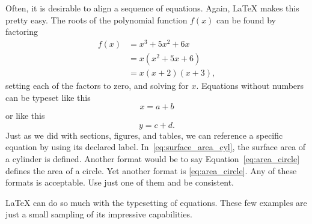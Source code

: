 Often, it is desirable to align a sequence of equations. Again, \LaTeX{} makes this pretty easy. The roots of the polynomial function $f(x)$ can be found by factoring
\begin{align}
	f(x) &= x^3 + 5x^2 + 6x \\
		 & = x (x^2 + 5x + 6) \\
		 & = x (x + 2)(x +3) ,
\end{align}
setting each of the factors to zero, and solving for $x$. Equations without numbers can be typeset like this
\[
	x = a + b
\]
or like this
\begin{equation*}
	y = c + d .
\end{equation*}
Just as we did with sections, figures, and tables, we can reference a specific equation by using its declared label. In~\eqref{eq:surface_area_cyl}, the surface area of a cylinder is defined. Another format would be to say Equation~\ref{eq:area_circle} defines the area of a circle. Yet another format is \cref{eq:area_circle}. Any of these formats is acceptable. Use just one of them and be consistent.

\LaTeX{} can do so much with the typesetting of equations. These few examples are just a small sampling of its impressive capabilities.


